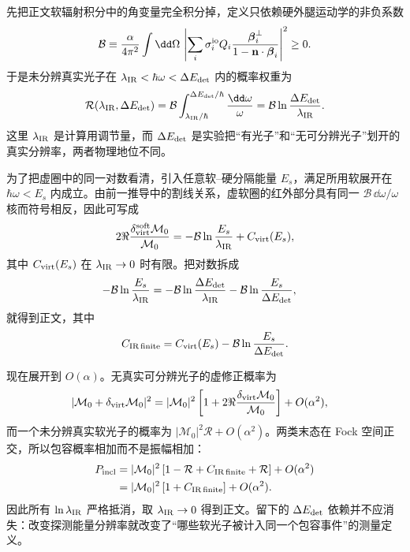 \begin{derivation}
先把正文软辐射积分中的角变量完全积分掉，定义只依赖硬外腿运动学的非负系数
\begin{equation*}
 \mathcal B
 \equiv\frac{\alpha}{4\pi^2}
 \int\dd\Omega\,
 \left|
 \sum_i\sigma_i^{\rm io}Q_i
 \frac{\boldsymbol\beta_i^\perp}
 {1-\mathbf n\cdot\boldsymbol\beta_i}
 \right|^2\ge0.
\end{equation*}
于是未分辨真实光子在
$\lambda_{\rm IR}<\hbar\omega<\Delta E_{\rm det}$ 内的概率权重为
\begin{equation*}
 \mathcal R(\lambda_{\rm IR},\Delta E_{\rm det})
 =\mathcal B\int_{\lambda_{\rm IR}/\hbar}^{\Delta E_{\rm det}/\hbar}
 \frac{\dd\omega}{\omega}
 =\mathcal B\ln\frac{\Delta E_{\rm det}}{\lambda_{\rm IR}}.
\end{equation*}
这里 $\lambda_{\rm IR}$ 是计算用调节量，而 $\Delta E_{\rm det}$ 是实验把“有光子”和“无可分辨光子”划开的真实分辨率，两者物理地位不同。

为了把虚圈中的同一对数看清，引入任意软--硬分隔能量 $E_s$，满足所用软展开在
$\hbar\omega<E_s$ 内成立。由前一推导中的割线关系，虚软圈的红外部分具有同一 $\mathcal B\,\dd\omega/\omega$ 核而符号相反，因此可写成
\begin{equation*}
 2\Re\frac{\delta_{\rm virt}^{\rm soft}\mathcal M_0}{\mathcal M_0}
 =-\mathcal B\ln\frac{E_s}{\lambda_{\rm IR}}
 +C_{\rm virt}(E_s),
\end{equation*}
其中 $C_{\rm virt}(E_s)$ 在 $\lambda_{\rm IR}\to0$ 时有限。把对数拆成
\begin{align*}
 -\mathcal B\ln\frac{E_s}{\lambda_{\rm IR}}
 &=-\mathcal B\ln\frac{\Delta E_{\rm det}}{\lambda_{\rm IR}}
   -\mathcal B\ln\frac{E_s}{\Delta E_{\rm det}},
\end{align*}
就得到正文，其中
\[
 C_{\rm IR\,finite}
 =C_{\rm virt}(E_s)-\mathcal B\ln\frac{E_s}{\Delta E_{\rm det}}.
\]

现在展开到 $O(\alpha)$。无真实可分辨光子的虚修正概率为
\begin{align*}
 |\mathcal M_0+\delta_{\rm virt}\mathcal M_0|^2
 &=|\mathcal M_0|^2
 \left[1+2\Re\frac{\delta_{\rm virt}\mathcal M_0}{\mathcal M_0}\right]
 +O(\alpha^2),
\end{align*}
而一个未分辨真实软光子的概率为
$|\mathcal M_0|^2\mathcal R+O(\alpha^2)$。两类末态在 Fock 空间正交，所以包容概率相加而不是振幅相加：
\begin{align*}
 P_{\rm incl}
 &=|\mathcal M_0|^2
 \left[
 1-\mathcal R+C_{\rm IR\,finite}+\mathcal R
 \right]+O(\alpha^2)\\
 &=|\mathcal M_0|^2
 \left[1+C_{\rm IR\,finite}\right]+O(\alpha^2).
\end{align*}
因此所有 $\ln\lambda_{\rm IR}$ 严格抵消，取
$\lambda_{\rm IR}\to0$ 得到正文。留下的
$\Delta E_{\rm det}$ 依赖并不应消失：改变探测能量分辨率就改变了“哪些软光子被计入同一个包容事件”的测量定义。
\end{derivation}

